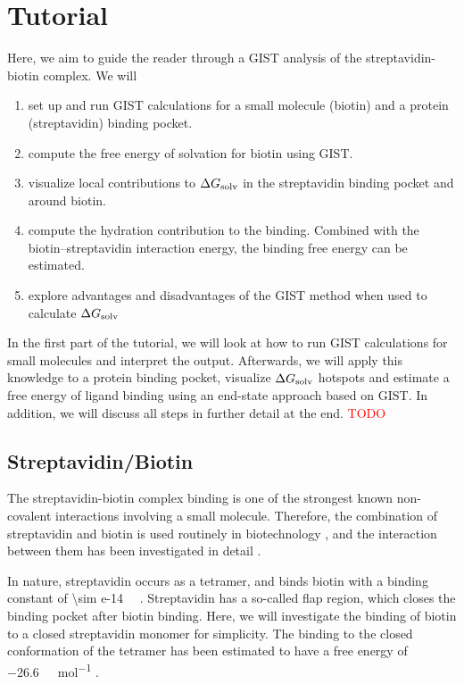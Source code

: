 \documentclass[9pt,tutorial]{livecoms}
\newcommand{\dgsolv}{\Delta G_\textup{solv}}
\newcommand{\todo}{\textcolor{red}}
\begin{document}
\section{Tutorial}
Here, we aim to guide the reader through a GIST analysis of the streptavidin-biotin complex.
We will
\begin{enumerate}
	\item set up and run GIST calculations for a small molecule (biotin) and a protein (streptavidin) binding pocket.
	\item compute the free energy of solvation for biotin using GIST.
	\item visualize local contributions to $\dgsolv$ in the streptavidin binding pocket and around biotin.
	\item compute the hydration contribution to the binding. Combined with the biotin--streptavidin interaction energy, the binding free energy can be estimated.
	\item explore advantages and disadvantages of the GIST method when used to calculate  $\dgsolv$
\end{enumerate}

In the first part of the tutorial, we will look at how to run GIST calculations for small molecules and interpret the output.
Afterwards, we will apply this knowledge to a protein binding pocket, visualize $\dgsolv$ hotspots and estimate a free energy of ligand binding using an end-state approach based on GIST. In addition, we will discuss all steps in further detail at the end. \todo{TODO}

\subsection{Streptavidin/Biotin}
The streptavidin-biotin complex binding is one of the strongest known non-covalent interactions involving a small molecule.
Therefore, the combination of streptavidin and biotin is used routinely in biotechnology \cite{Dundas2013-streptavidin-review}, and the interaction between them has been investigated in detail \cite{McConnell2021-biotin}.

\newcommand{\appr}{{\mathord{\sim}}}
In nature, streptavidin occurs as a tetramer, and binds biotin with a binding constant of \SI{\sim e-14}{\per\Molar} \cite{Dundas2013-streptavidin-review}.
Streptavidin has a so-called flap region, which closes the binding pocket after biotin binding.
Here, we will investigate the binding of biotin to a closed streptavidin monomer for simplicity.
The binding to the closed conformation of the tetramer has been estimated to have a free energy of \SI{-26.6}{\kilo\calorie\per\mol} \cite{Bansal2018-biotin}.
\end{document}
